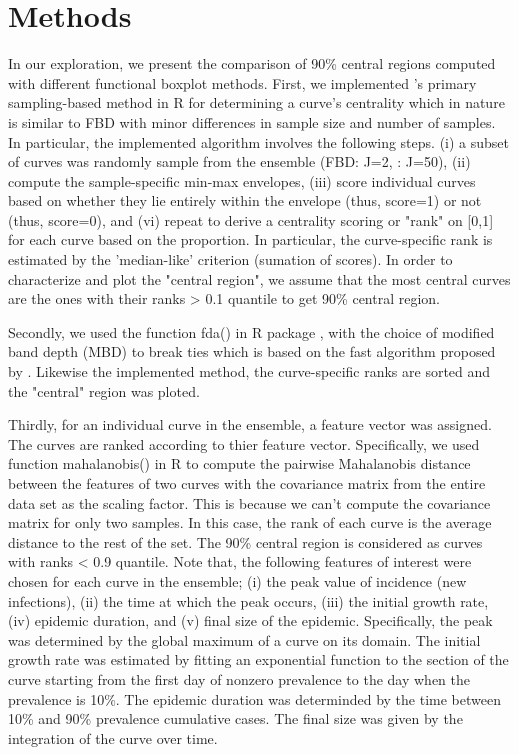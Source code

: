\documentclass[fleqn,10pt,lineno]{wlpeerj}
\begin{document}
\section*{Methods}

In our exploration, we present the comparison of 90\% central regions computed with different functional boxplot methods.
First, we implemented \juul's primary sampling-based method in R \citep{R} for determining a curve's centrality which in nature is similar to FBD with minor differences in sample size and number of samples. In particular, the implemented algorithm involves the following steps. (i) a subset of curves was randomly sample from the ensemble (FBD: J=2, \juul : J=50), (ii) compute the sample-specific min-max envelopes, (iii) score individual curves based on whether they lie entirely within the envelope (thus, score=1) or not (thus, score=0), and (vi) repeat to derive a centrality scoring or "rank" on [0,1] for each curve based on the proportion. In particular, the curve-specific rank is estimated by the 'median-like' criterion (sumation of scores). In order to characterize and plot the "central region", we assume that the most central curves are the ones with their ranks > 0.1 quantile to get 90\% central region. 

Secondly, we used the function fda() in R \citep{R} package  \citep{roahd}, with the choice of modified band depth (MBD) to break ties which is based on the fast algorithm proposed by \cite{sun2012exact}. Likewise the implemented method, the curve-specific ranks are sorted and the "central" region was ploted. 

Thirdly, for an individual curve in the ensemble, a feature vector was assigned. The curves are ranked according to thier feature vector. Specifically, we used function mahalanobis() in R \citep{R} to compute the pairwise Mahalanobis distance between the features of two curves with the covariance matrix from the entire data set as the scaling factor. This is because we can't compute the covariance matrix for only two samples. In this case, the rank of each curve is the average distance to the rest of the set. The 90\% central region is considered as curves with ranks < 0.9 quantile. Note that, the following features of interest were chosen for each curve in the ensemble; (i) the peak value of incidence (new infections), (ii) the time at which the peak occurs, (iii) the initial growth rate, (iv) epidemic duration, and (v) final size of the epidemic. Specifically, the peak was determined by the global maximum of a curve on its domain. The initial growth rate was estimated by fitting an exponential function to the section of the curve starting from the first day of nonzero prevalence to the day when the prevalence is 10\%. The epidemic duration was determinded by the time between 10\% and 90\% prevalence cumulative cases. The final size was given by the integration of the curve over time.
\end{document}
